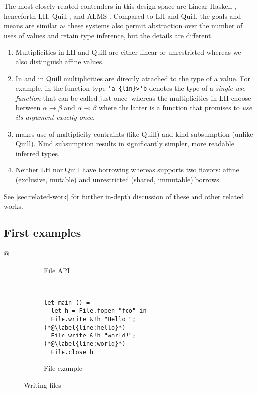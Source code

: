 The most closely related contenders in this design space are Linear Haskell
\cite{DBLP:journals/pacmpl/BernardyBNJS18}, henceforth LH,
Quill \cite{DBLP:conf/icfp/Morris16}, and ALMS \cite{DBLP:conf/popl/TovP11}.
Compared to LH and Quill, the goals and means are
similar as these systems also permit abstraction over the number of uses of
values and retain type inference, but the details are different.
\begin{enumerate}
\item Multiplicities in LH and Quill are either linear or unrestricted whereas
  we also distinguish affine values.
\item In \lang{} and in Quill multiplicities are directly attached to the type of a
  value. For example, in \lang{} the function type \lstinline/'a-{lin}>'b/
  denotes the type of a \emph{single-use function} that can be called
  just once, whereas the multiplicities in LH choose
  between $\alpha\to\beta$ and $\alpha \multimap\beta$ where the
  latter is a function that promises to \emph{use its argument exactly
    once}.
\item \lang{} makes use of multiplicity contraints (like Quill) and kind
  subsumption (unlike Quill). Kind subsumption results in significantly simpler, more readable
  inferred types.
\item Neither LH nor Quill have borrowing whereas \lang{} supports
  two flavors: affine (exclusive, mutable) and unrestricted (shared, immutable) borrows.
\end{enumerate}
See \cref{sec:related-work} for further in-depth discussion of these
and other related works.

\subsection{First examples}
\label{sec:first-example}


\lstMakeShortInline[keepspaces,basicstyle=\small\ttfamily]@

\begin{figure}[tp]
  \begin{subfigure}[t]{0.53\linewidth}
    
    \vspace{-15pt}
    \caption{File API}
    \label{fig:writing-files-api}
  \end{subfigure}~
  \begin{subfigure}[t]{0.43\linewidth}
\begin{lstlisting}
let main () =
  let h = File.fopen "foo" in
  File.write &!h "Hello ";(*@\label{line:hello}*)
  File.write &!h "world!";(*@\label{line:world}*)
  File.close h
\end{lstlisting}
    \vspace{-10pt}
    \caption{File example}
    \label{fig:writing-files-example}
  \end{subfigure}
  \vspace{-10pt}
  \caption{Writing files}
  \label{fig:writing-files}
\end{figure}



